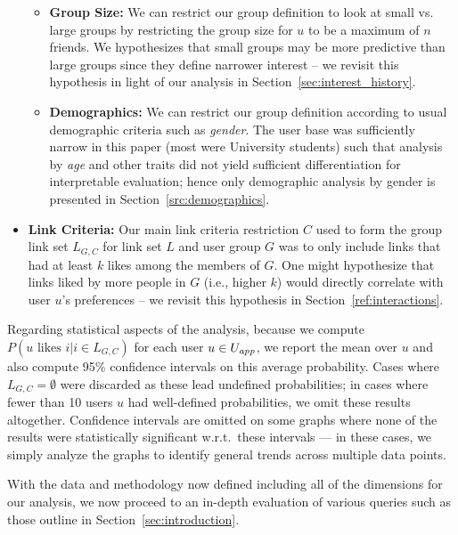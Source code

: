 \begin{itemize}
\begin{itemize}
    \item \textbf{Group Size:} We can restrict our group definition
      to look at small vs. large groups by restricting the group
      size for $u$ to be a maximum of $n$ friends.  We hypothesizes
      that small groups may be more predictive than large groups since
      they define narrower interest -- we revisit this hypothesis
      in light of our analysis in Section~\ref{sec:interest_history}.
    \item \textbf{Demographics:} We can restrict our group definition
      according to usual demographic criteria such as \emph{gender}.
      The user base was sufficiently narrow in this paper (most were
      University students) such that analysis by \emph{age} and other
      traits did not yield sufficient differentiation for
      interpretable evaluation; hence only demographic analysis by
      gender is presented in Section~\ref{src:demographics}.
  \end{itemize}
\item \textbf{Link Criteria:} Our main link criteria restriction $C$
      used to form the group link set $L_{G,C}$ for link set $L$
      and user group $G$ was to only include links that had at least
      $k$ likes among the members of $G$.  One might hypothesize
      that links liked by more people in $G$ (i.e., higher $k$)
      would directly correlate with user $u$'s preferences -- we
      revisit this hypothesis in Section~\ref{ref:interactions}.
\end{itemize}

Regarding statistical aspects of the analysis, 
because we compute $P(u \mbox{ likes } i | i \in L_{G,C})$ for each
user $u \in U_{\mathit{app}}$, we report the mean over $u$ and also compute 95\%
confidence intervals on this average probability.  Cases where
$L_{G,C} = \emptyset$ were discarded as these lead undefined
probabilities; in cases where fewer than 10 users $u$ had well-defined
probabilities, we omit these results altogether.  Confidence intervals
are omitted on some graphs where none of the results were
statistically significant w.r.t.\ these intervals --- in these cases,
we simply analyze the graphs to identify general trends across
multiple data points.

With the data and methodology now defined including all of the
dimensions for our analysis, 
we now proceed to an in-depth evaluation of various
queries such as those outline in Section~\ref{sec:introduction}.

